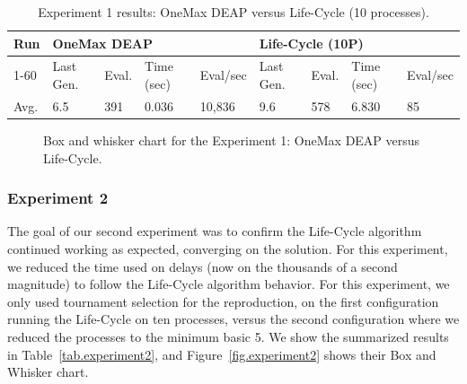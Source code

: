 \documentclass[graybox]{svmult}
\begin{document}
\begin{table}[]
    \centering        
    \caption{Experiment 1 results: OneMax DEAP versus Life-Cycle (10 processes).}\label{tab.experiment1}
    \begin{tabular}{|l|l|l|l|l|l|l|l|l|}
    \hline
    Run & \multicolumn{4}{l|}{OneMax DEAP} & \multicolumn{4}{l|}{Life-Cycle (10P)} \\ \hline
    1-60 & Last Gen. & Eval. & Time (sec) & Eval/sec & Last Gen. & Eval. & Time (sec) & Eval/sec \\ \hline
    Avg. & 6.5 & 391 & 0.036 & 10,836 & 9.6 & 578 & 6.830 & 85 \\ \hline
    \end{tabular}
    \end{table}

\begin{figure}
    \caption{Box and whisker chart for the Experiment 1: OneMax DEAP versus Life-Cycle.} \label{fig.experiment1}
  \end{figure}


\subsubsection{Experiment 2} The goal of our second experiment was to confirm
the Life-Cycle algorithm continued working as expected, converging on the
solution. For this experiment, we reduced the time used on delays (now on the
thousands of a second magnitude) to follow the Life-Cycle algorithm behavior.
For this experiment, we only used tournament selection for the reproduction, on
the first configuration running the Life-Cycle on ten processes, versus the
second configuration where we reduced the processes to the minimum basic 5. We
show the summarized results in Table~\ref{tab.experiment2}, and
Figure~\ref{fig.experiment2} shows their Box and Whisker chart.
\end{document}
